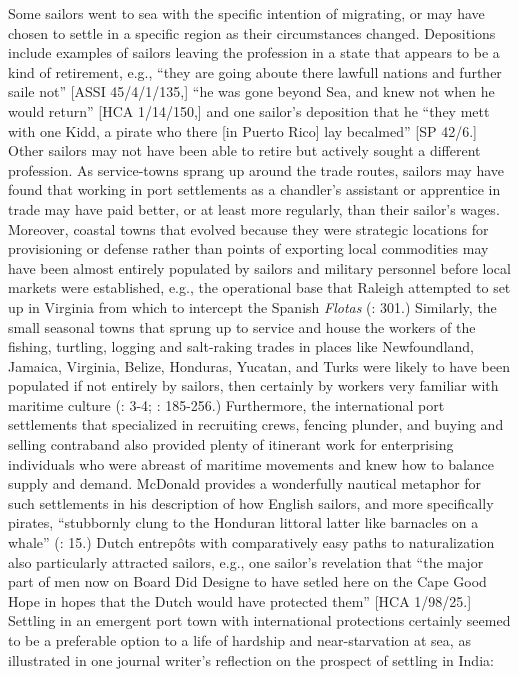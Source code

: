   Some sailors went to sea with the specific intention of migrating, or may have chosen to settle in a specific region as their circumstances changed.  Depositions include examples of sailors leaving the profession in a state that appears to be a kind of retirement, e.g., “they are going aboute there lawfull nations and further saile not” [ASSI 45/4/1/135,] “he was gone beyond Sea, and knew not when he would return” [HCA 1/14/150,] and one sailor’s deposition that he “they mett with one Kidd, a pirate who there [in Puerto Rico] lay becalmed” [SP 42/6.] Other sailors may not have been able to retire but actively sought a different profession. As service-towns sprang up around the trade routes, sailors may have found that working in port settlements as a chandler’s assistant or apprentice in trade may have paid better, or at least more regularly, than their sailor’s wages. Moreover, coastal towns that evolved because they were strategic locations for provisioning or defense rather than points of exporting local commodities may have been almost entirely populated by sailors and military personnel before local markets were established, e.g., the operational base that Raleigh attempted to set up in Virginia from which to intercept the Spanish \textit{Flotas} (\citealt{Bicheno2012}: 301.) Similarly, the small seasonal towns that sprung up to service and house the workers of the fishing, turtling, logging and salt-raking trades in places like Newfoundland, Jamaica, Virginia, Belize, Honduras, Yucatan, and Turks were likely to have been populated if not entirely by sailors, then certainly by workers very familiar with maritime culture (\citealt{Draper2016}: 3-4; \citealt{Jarvis2010}: 185-256.) Furthermore, the international port settlements that specialized in recruiting crews, fencing plunder, and buying and selling contraband also provided plenty of itinerant work for enterprising individuals who were abreast of maritime movements and knew how to balance supply and demand. McDonald provides a wonderfully nautical metaphor for such settlements in his description of how English sailors, and more specifically pirates, “stubbornly clung to the Honduran littoral latter like barnacles on a whale” (\citealt{McDonald2016}: 15.) Dutch entrepôts with comparatively easy paths to naturalization also particularly attracted sailors, e.g., one sailor’s revelation that “the major part of men now on Board Did Designe to have setled here on the Cape Good Hope in hopes that the Dutch would have protected them” [HCA 1/98/25.] Settling in an emergent port town with international protections certainly seemed to be a preferable option to a life of hardship and near-starvation at sea, as illustrated in one journal writer’s reflection on the prospect of settling in India:

